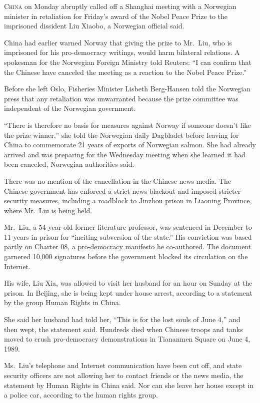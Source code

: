 ﻿\documentclass[12pt]{article}
\begin{document}
\lettrine{C}{hina} on Monday abruptly called off a Shanghai meeting with a
Norwegian minister in retaliation for Friday's award of the Nobel Peace Prize to the imprisoned
dissident Liu Xiaobo, a Norwegian official said.

China had earlier warned Norway that giving the prize to Mr.~Liu, who is imprisoned for his
pro-democracy writings, would harm bilateral relations. A spokesman for the Norwegian Foreign
Ministry told Reuters: ``I can confirm that the Chinese have canceled the meeting as a reaction to
the Nobel Peace Prize.''

Before she left Oslo, Fisheries Minister Lisbeth Berg-Hansen told the Norwegian press that any
retaliation was unwarranted because the prize committee was independent of the Norwegian government.

``There is therefore no basis for measures against Norway if someone doesn't like the prize
winner,'' she told the Norwegian daily Dagbladet before leaving for China to commemorate 21 years of
exports of Norwegian salmon. She had already arrived and was preparing for the Wednesday meeting
when she learned it had been canceled, Norwegian authorities said.

There was no mention of the cancellation in the Chinese news media. The Chinese government has
enforced a strict news blackout and imposed stricter security measures, including a roadblock to
Jinzhou prison in Liaoning Province, where Mr.~Liu is being held.

Mr.~Liu, a 54-year-old former literature professor, was sentenced in December to 11 years in prison
for ``inciting subversion of the state.'' His conviction was based partly on Charter 08, a
pro-democracy manifesto he co-authored. The document garnered 10,000 signatures before the
government blocked its circulation on the Internet.

His wife, Liu Xia, was allowed to visit her husband for an hour on Sunday at the prison. In Beijing,
she is being kept under house arrest, according to a statement by the group Human Rights in China.

She said her husband had told her, ``This is for the lost souls of June 4,'' and then wept, the
statement said. Hundreds died when Chinese troops and tanks moved to crush pro-democracy
demonstrations in Tiananmen Square on June 4, 1989.

Ms.~Liu's telephone and Internet communication have been cut off, and state security officers are
not allowing her to contact friends or the news media, the statement by Human Rights in China said.
Nor can she leave her house except in a police car, according to the human rights group.
\end{document}
